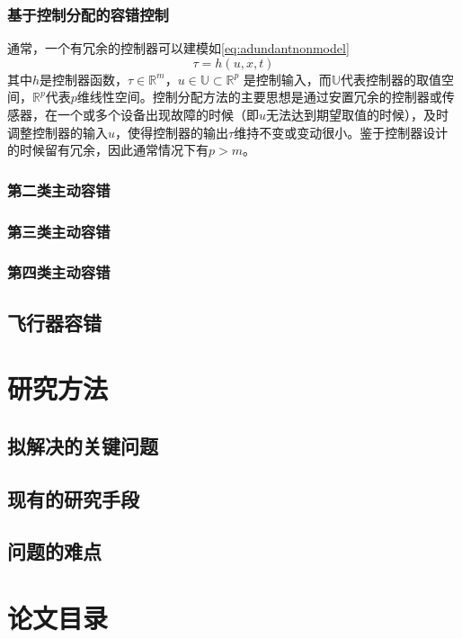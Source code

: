 \documentclass{article}
\begin{document}
\subsubsection{基于控制分配的容错控制}
通常，一个有冗余的控制器可以建模如\eqref{eq:adundantnonmodel}
\begin{equation}\label{eq:adundantnonmodel}
\tau = h(u,x,t)
\end{equation}
其中$h$是控制器函数，$\tau \in \mathbb{R}^m$，$u\in \mathbb{U} \subset \mathbb{R}^p$ 是控制输入，而$\mathbb{U}$代表控制器的取值空间，$\mathbb{R}^p$代表$p$维线性空间。控制分配方法的主要思想是通过安置冗余的控制器或传感器，在一个或多个设备出现故障的时候（即$u$无法达到期望取值的时候），及时调整控制器的输入$u$，使得控制器的输出$\tau$维持不变或变动很小。鉴于控制器设计的时候留有冗余，因此通常情况下有$p>m$。
\subsubsection{第二类主动容错}
\subsubsection{第三类主动容错}
\subsubsection{第四类主动容错}
\subsection{飞行器容错}\label{subsec:aircraftftc}



\section{研究方法}
\subsection{拟解决的关键问题}
\subsection{现有的研究手段}
\subsection{问题的难点}

\section{论文目录}



\end{document}
